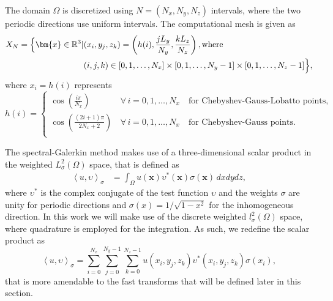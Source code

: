 \documentclass[preprint]{elsarticle}
\begin{document}
The domain $\Omega$ is discretized using $N = (N_x, N_y, N_z)$ intervals, where the two periodic directions use uniform intervals. The computational mesh is given as
\begin{align}
X_N = \Big\{ \bm{x} \in \mathbb{R}^3 | &(x_i, y_j, z_k) = \left( h(i), \frac{jL_y}{N_y}, \frac{kL_z}{N_z} \right), \text{where} \notag \\
&(i, j, k) \in [0, 1, \ldots, N_x] \times [0, 1, \ldots, N_y-1] \times [0, 1, \ldots, N_z-1] \Big\}, \label{eq:Xn}
\end{align}
where $x_i = h(i)$ represents
\begin{equation}
h(i) = \begin{cases}
\cos \left(\frac{i \pi }{N_x} \right) \, &\forall \, i=0,1, \ldots, N_x \quad  \text{for Chebyshev-Gauss-Lobatto points}, \\
\cos \left(\frac{(2i +1)\pi}{2N_x+2} \right) \, &\forall \, i=0,1, \ldots, N_x \quad  \text{for Chebyshev-Gauss points}. \\
\end{cases}
\end{equation}

The spectral-Galerkin method makes use of a three-dimensional scalar product in the weighted $L^2_{\sigma}(\Omega)$ space, that is defined as
\begin{align}
\left<u, \upsilon \right>_{\sigma} &= \int_{\Omega} {u(\bm{x}) \upsilon^*(\bm{x})} \sigma(\bm{x})\,dxdydz, 
\end{align}
where $\upsilon^*$ is the complex conjugate of the test function $\upsilon$ and the weights $\sigma$ are unity for 
periodic directions and  $\sigma(x)=1/\sqrt{1-x^2}$ for the inhomogeneous direction. In 
this work we will make use of the discrete weighted $l^2_{\sigma}(\Omega)$ space, 
where quadrature is employed for the integration. As such, we redefine the scalar product as
\begin{equation}
\left<u, \upsilon\right>_{\sigma} = \sum_{i=0}^{N_x}\sum_{j=0}^{N_y-1} \sum_{k=0}^{N_z-1} u(x_i, y_j, z_k) \upsilon^*(x_i, y_j, z_k) \sigma(x_i), \label{eq:quadrature}
\end{equation}
that is more amendable to the fast transforms that will be defined later in this section.
\end{document}
